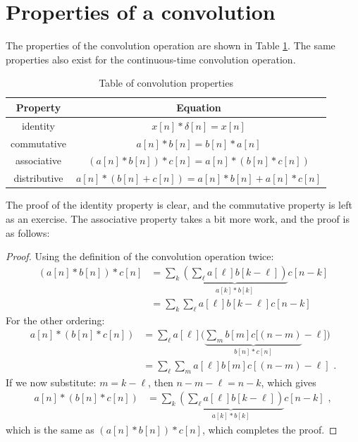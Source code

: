 \section{Properties of a convolution}
The properties of the convolution operation are shown in Table \ref{con:table}. 
The same properties also exist for the continuous-time convolution
operation.
\begin{table}
  \centering
  \caption{Table of convolution properties}
  \label{con:table}
  \begin{tabular}{|c|c|}
    \hline
    Property     & Equation                                     \\ \hline
    identity     & $x[n]*\delta[n]=x[n]$                        \\ \hline
    commutative  & $a[n] * b[n] = b[n] * a[n]$                  \\ \hline
    associative  & $(a[n]*b[n]) * c[n] = a[n] * ( b[n] * c[n])$ \\ \hline
    distributive & $a[n]*(b[n]+c[n]) = a[n]*b[n] + a[n]*c[n]$   \\ \hline
  \end{tabular}
\end{table}

The proof of the identity property is clear, and the commutative property is left as an exercise. 
The associative property takes a bit more work, and the proof is as follows:
\begin{proof}
  Using the definition of the convolution operation twice:
  \begin{align}
    (a[n]*b[n])*c[n] & = \sum_{k}\underbrace{\left(\sum_\ell a[\ell]b[k-\ell]\right)}_{a[k]*b[k]} c[n-k] \\
                     & = \sum_{k}\sum_\ell a[\ell]b[k-\ell]c[n-k]
  \end{align}
  For the other ordering:
  \begin{align}
    a[n]*(b[n]*c[n]) & = \sum_{\ell} a[\ell] \Big(\underbrace{\sum_m b[m]c[(n-m)}_{b[n]*c[n]}-\ell]\Big) \\
                     & = \sum_{\ell} \sum_m a[\ell] b[m]c[(n-m)-\ell]\,\,.
  \end{align}
  If we now substitute: $m=k-\ell$, then $n-m-\ell=n-k$, which gives
  \begin{align}
    a[n]*(b[n]*c[n]) & = \sum_{k} \underbrace{\left(\sum_{\ell} a[\ell] b[k-\ell]\right)}_{a[k]*b[k]} c[n-k]\,\,,
  \end{align}
  which is the same as $(a[n]*b[n])*c[n]$, which completes the proof.
\end{proof}

